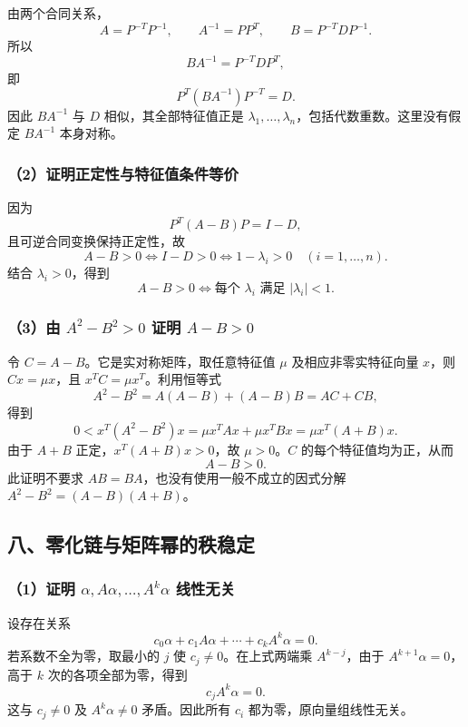 \documentclass[11pt,fontset=fandol]{ctexart}
\begin{document}
由两个合同关系， \[
A=P^{-T}P^{-1},\qquad A^{-1}=PP^T,\qquad
B=P^{-T}DP^{-1}.
\] 所以 \[
BA^{-1}=P^{-T}DP^T,
\] 即 \[
\boxed{P^T(BA^{-1})P^{-T}=D.}
\] 因此 \(BA^{-1}\) 与 \(D\) 相似，其全部特征值正是
\(\lambda_1,\ldots,\lambda_n\)，包括代数重数。这里没有假定 \(BA^{-1}\)
本身对称。

\subsubsection{（2）证明正定性与特征值条件等价}\label{ux8bc1ux660eux6b63ux5b9aux6027ux4e0eux7279ux5f81ux503cux6761ux4ef6ux7b49ux4ef7}

因为 \[
P^T(A-B)P=I-D,
\] 且可逆合同变换保持正定性，故 \[
A-B>0\iff I-D>0
\iff1-\lambda_i>0\quad(i=1,\ldots,n).
\] 结合 \(\lambda_i>0\)，得到 \[
\boxed{A-B>0\iff\text{每个 }\lambda_i\text{ 满足 }|\lambda_i|<1.}
\]

\subsubsection{\texorpdfstring{（3）由 \(A^2-B^2>0\) 证明
\(A-B>0\)}{（3）由 A\^{}2-B\^{}2\textgreater0 证明 A-B\textgreater0}}\label{ux7531-a2-b20-ux8bc1ux660e-a-b0}

令 \(C=A-B\)。它是实对称矩阵，取任意特征值 \(\mu\) 及相应非零实特征向量
\(x\)，则 \(Cx=\mu x\)，且 \(x^TC=\mu x^T\)。利用恒等式 \[
A^2-B^2=A(A-B)+(A-B)B=AC+CB,
\] 得到 \[
0<x^T(A^2-B^2)x
=\mu x^TAx+\mu x^TBx
=\mu x^T(A+B)x.
\] 由于 \(A+B\) 正定，\(x^T(A+B)x>0\)，故 \(\mu>0\)。\(C\)
的每个特征值均为正，从而 \[
\boxed{A-B>0.}
\] 此证明不要求 \(AB=BA\)，也没有使用一般不成立的因式分解
\(A^2-B^2=(A-B)(A+B)\)。

\subsection{八、零化链与矩阵幂的秩稳定}\label{ux516bux96f6ux5316ux94feux4e0eux77e9ux9635ux5e42ux7684ux79e9ux7a33ux5b9a}

\subsubsection{\texorpdfstring{（1）证明
\(\alpha,A\alpha,\ldots,A^k\alpha\)
线性无关}{（1）证明 \textbackslash alpha,A\textbackslash alpha,\textbackslash ldots,A\^{}k\textbackslash alpha 线性无关}}\label{ux8bc1ux660e-alphaaalphaldotsakalpha-ux7ebfux6027ux65e0ux5173}

设存在关系 \[
c_0\alpha+c_1A\alpha+\cdots+c_kA^k\alpha=0.
\] 若系数不全为零，取最小的 \(j\) 使 \(c_j\neq0\)。在上式两端乘
\(A^{k-j}\)，由于 \(A^{k+1}\alpha=0\)，高于 \(k\) 次的各项全部为零，得到
\[
c_jA^k\alpha=0.
\] 这与 \(c_j\neq0\) 及 \(A^k\alpha\neq0\) 矛盾。因此所有 \(c_i\)
都为零，原向量组线性无关。
\end{document}
